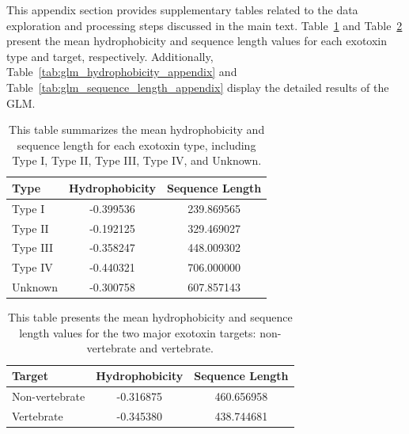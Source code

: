 This appendix section provides supplementary tables related to the data exploration and processing steps discussed in the main text. Table~\ref{fig:mean_value_type} and Table~\ref{fig:mean_value_target} present the mean hydrophobicity and sequence length values for each exotoxin type and target, respectively. 
Additionally, Table~\ref{tab:glm_hydrophobicity_appendix} and Table~\ref{tab:glm_sequence_length_appendix} display the detailed results of the \gls{GLM}.


\begin{table}[ht]
	\centering
	\caption{This table summarizes the mean hydrophobicity and sequence length for each exotoxin type, including Type I, Type II, Type III, Type IV, and Unknown.}
	\begin{tabular}{lcc}
		\toprule
		Type      & Hydrophobicity & Sequence Length \\
		\midrule
		Type I    & -0.399536      & 239.869565      \\
		Type II   & -0.192125      & 329.469027      \\
		Type III  & -0.358247      & 448.009302      \\
		Type IV   & -0.440321      & 706.000000      \\
		Unknown   & -0.300758      & 607.857143      \\
		\bottomrule
	\end{tabular}
		\label{fig:mean_value_type}
\end{table}

\begin{table}[ht]
	\centering
	\caption{This table presents the mean hydrophobicity and sequence length values for the two major exotoxin targets: non-vertebrate and vertebrate.}
	\begin{tabular}{lcc}
		\toprule
		Target          & Hydrophobicity & Sequence Length \\
		\midrule
		Non-vertebrate  & -0.316875      & 460.656958      \\
		Vertebrate      & -0.345380      & 438.744681      \\
		\bottomrule
	\end{tabular}
	\label{fig:mean_value_target}
\end{table}

